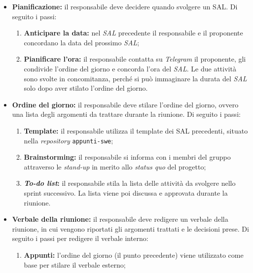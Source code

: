 \begin{itemize}

	\item \textbf{Pianificazione:} il responsabile deve decidere quando svolgere
	      un SAL. Di seguito i passi:
	      \begin{enumerate}
		      \item \textbf{Anticipare la data:} nel \textit{SAL}
		            precedente il responsabile e il proponente concordano
		            la data del prossimo \textit{SAL};

		      \item \textbf{Pianificare l'ora:} il responsabile contatta su
		            \textit{Telegram} il proponente, gli condivide l'ordine del
		            giorno e concorda l'ora del \textit{SAL}. Le due attività
		            sono svolte in concomitanza, perché si può immaginare la
		            durata del \textit{SAL} solo dopo aver stilato l'ordine del
		            giorno.
	      \end{enumerate}

	\item \textbf{Ordine del giorno:} il responsabile deve stilare l'ordine del
	      giorno, ovvero una lista degli argomenti da trattare durante la
	      riunione. Di seguito i passi:
	      \begin{enumerate}
		      \item \textbf{Template:} il responsabile utilizza il template
		            dei SAL precedenti, situato nella \textit{repository}
		            \texttt{appunti-swe};

		      \item \textbf{Brainstorming:} il responsabile si informa con i
		            membri del gruppo attraverso le \textit{stand-up} in merito
		            allo \textit{status quo} del progetto;

		      \item \textbf{\textit{To-do list}:} il responsabile stila la lista
		            delle attività da svolgere nello sprint successivo. La
		            lista viene poi discussa e approvata durante la riunione.
	      \end{enumerate}

	\item \textbf{Verbale della riunione:} il responsabile deve redigere un
	      verbale della riunione, in cui vengono riportati gli argomenti
	      trattati e le decisioni prese. Di seguito i passi per redigere il
	      verbale interno:
	      \begin{enumerate}
		      \item \textbf{Appunti:} l'ordine del giorno (il punto precedente)
		            viene utilizzato come base per stilare il verbale esterno;


\end{enumerate}
\end{itemize}
